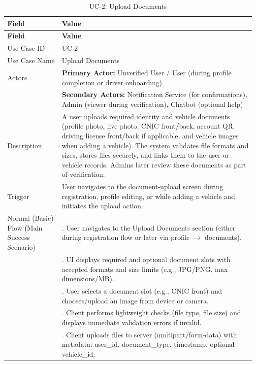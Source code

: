 \begin{longtable}{|>{\raggedright\arraybackslash}p{4cm}|>{\raggedright\arraybackslash}p{11cm}|}
\caption{UC-2: Upload Documents}
\label{tab:uc-2} \\
\hline
\rowcolor{lightgray!30}
\textbf{Field} & \textbf{Value} \\
\hline
\endfirsthead
\hline
\rowcolor{lightgray!30}
\textbf{Field} & \textbf{Value} \\
\hline
\endhead
\hline
\endfoot
\hline
\endlastfoot
Use Case ID & UC-2 \\
\hline
Use Case Name & Upload Documents \\
\hline
Actors & \textbf{Primary Actor:} Unverified User / User (during profile completion or driver onboarding) \\
& \textbf{Secondary Actors:} Notification Service (for confirmations), Admin (viewer during verification), Chatbot (optional help) \\
\hline
Description & A user uploads required identity and vehicle documents (profile photo, live photo, CNIC front/back, account QR, driving license front/back if applicable, and vehicle images when adding a vehicle). The system validates file formats and sizes, stores files securely, and links them to the user or vehicle records. Admins later review these documents as part of verification. \\
\hline
Trigger & User navigates to the document-upload screen during registration, profile editing, or while adding a vehicle and initiates the upload action. \\
\hline
Normal (Basic) Flow (Main Success Scenario) & 1. User navigates to the Upload Documents section (either during registration flow or later via profile $\rightarrow$ documents). \\
& 2. UI displays required and optional document slots with accepted formats and size limits (e.g., JPG/PNG, max dimensions/MB). \\
& 3. User selects a document slot (e.g., CNIC front) and chooses/upload an image from device or camera. \\
& 4. Client performs lightweight checks (file type, file size) and displays immediate validation errors if invalid. \\
& 5. Client uploads files to server (multipart/form-data) with metadata: user\_id, document\_type, timestamp, optional vehicle\_id. \\

\end{longtable}
